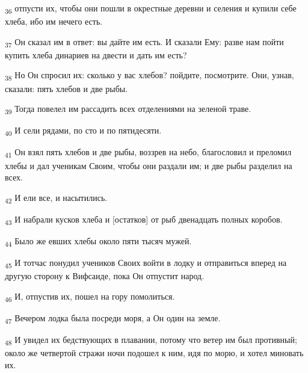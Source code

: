 \begin{tcolorbox}
\textsubscript{36} отпусти их, чтобы они пошли в окрестные деревни и селения и купили себе хлеба, ибо им нечего есть.
\end{tcolorbox}
\begin{tcolorbox}
\textsubscript{37} Он сказал им в ответ: вы дайте им есть. И сказали Ему: разве нам пойти купить хлеба динариев на двести и дать им есть?
\end{tcolorbox}
\begin{tcolorbox}
\textsubscript{38} Но Он спросил их: сколько у вас хлебов? пойдите, посмотрите. Они, узнав, сказали: пять хлебов и две рыбы.
\end{tcolorbox}
\begin{tcolorbox}
\textsubscript{39} Тогда повелел им рассадить всех отделениями на зеленой траве.
\end{tcolorbox}
\begin{tcolorbox}
\textsubscript{40} И сели рядами, по сто и по пятидесяти.
\end{tcolorbox}
\begin{tcolorbox}
\textsubscript{41} Он взял пять хлебов и две рыбы, воззрев на небо, благословил и преломил хлебы и дал ученикам Своим, чтобы они раздали им; и две рыбы разделил на всех.
\end{tcolorbox}
\begin{tcolorbox}
\textsubscript{42} И ели все, и насытились.
\end{tcolorbox}
\begin{tcolorbox}
\textsubscript{43} И набрали кусков хлеба и [остатков] от рыб двенадцать полных коробов.
\end{tcolorbox}
\begin{tcolorbox}
\textsubscript{44} Было же евших хлебы около пяти тысяч мужей.
\end{tcolorbox}
\begin{tcolorbox}
\textsubscript{45} И тотчас понудил учеников Своих войти в лодку и отправиться вперед на другую сторону к Вифсаиде, пока Он отпустит народ.
\end{tcolorbox}
\begin{tcolorbox}
\textsubscript{46} И, отпустив их, пошел на гору помолиться.
\end{tcolorbox}
\begin{tcolorbox}
\textsubscript{47} Вечером лодка была посреди моря, а Он один на земле.
\end{tcolorbox}
\begin{tcolorbox}
\textsubscript{48} И увидел их бедствующих в плавании, потому что ветер им был противный; около же четвертой стражи ночи подошел к ним, идя по морю, и хотел миновать их.
\end{tcolorbox}
